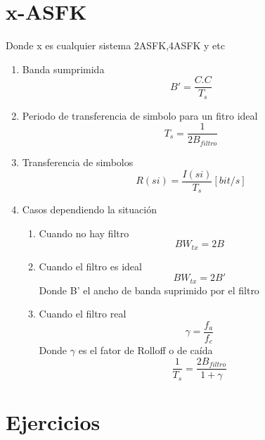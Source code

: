 \documentclass[10pt]{article}
\begin{document}
	\section{x-ASFK}
	Donde x es cualquier sistema 2ASFK,4ASFK y etc
	\begin{enumerate}
			\item Banda sumprimida
		\begin{equation}
			B'=\frac{C.C}{T_s}
		\end{equation}
		\item  Periodo de transferencia de simbolo para un fitro ideal
		\begin{equation}
			T_s=\frac{1}{2B_{filtro}}
		\end{equation}
		\item Transferencia de simbolos
		\begin{equation}
			R(si)=\frac{I(si)}{T_s}[bit/s]
		\end{equation}
		\item Casos dependiendo la situación
		\begin{enumerate}
			\item  Cuando no hay filtro
			\begin{equation}
				BW_{tx}=2B
			\end{equation}
			\item  Cuando el filtro es ideal
			\begin{equation}
				BW_{tx}=2B'
			\end{equation}
			Donde B' el ancho de banda suprimido por el filtro

			\item Cuando el filtro real
		\begin{equation}
				\gamma =\frac{f_a}{f_c}
			\end{equation}
			Donde $\gamma$ es el fator de Rolloff o de caída
			\begin{equation}
				\frac{1}{T_s} =\frac{2B_{filtro}}{1+\gamma}
			\end{equation}
		
			\end{enumerate}
	\end{enumerate}
\section{Ejercicios}
\end{document}
